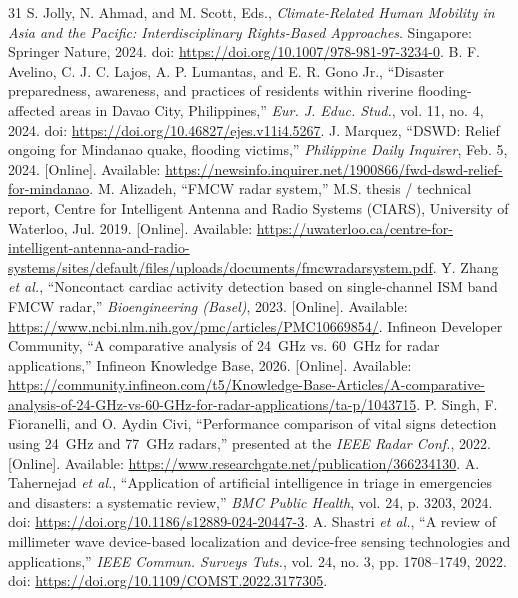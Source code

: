 \documentclass[10pt,conference]{IEEEtran}
\begin{document}
\begin{thebibliography}{31}
 S. Jolly, N. Ahmad, and M. Scott, Eds., \textit{Climate-Related Human Mobility in Asia and the Pacific: Interdisciplinary Rights-Based Approaches}. Singapore: Springer Nature, 2024. doi: \url{https://doi.org/10.1007/978-981-97-3234-0}.
 B. F. Avelino, C. J. C. Lajos, A. P. Lumantas, and E. R. Gono Jr., ``Disaster preparedness, awareness, and practices of residents within riverine flooding-affected areas in Davao City, Philippines,'' \textit{Eur. J. Educ. Stud.}, vol. 11, no. 4, 2024. doi: \url{https://doi.org/10.46827/ejes.v11i4.5267}.
 J. Marquez, ``DSWD: Relief ongoing for Mindanao quake, flooding victims,'' \textit{Philippine Daily Inquirer}, Feb. 5, 2024. [Online]. Available: \url{https://newsinfo.inquirer.net/1900866/fwd-dswd-relief-for-mindanao}.
 M. Alizadeh, ``FMCW radar system,'' M.S. thesis / technical report, Centre for Intelligent Antenna and Radio Systems (CIARS), University of Waterloo, Jul. 2019. [Online]. Available: \url{https://uwaterloo.ca/centre-for-intelligent-antenna-and-radio-systems/sites/default/files/uploads/documents/fmcwradarsystem.pdf}.
 Y. Zhang \textit{et al.}, ``Noncontact cardiac activity detection based on single-channel ISM band FMCW radar,'' \textit{Bioengineering (Basel)}, 2023. [Online]. Available: \url{https://www.ncbi.nlm.nih.gov/pmc/articles/PMC10669854/}.
 Infineon Developer Community, ``A comparative analysis of 24~GHz vs. 60~GHz for radar applications,'' Infineon Knowledge Base, 2026. [Online]. Available: \url{https://community.infineon.com/t5/Knowledge-Base-Articles/A-comparative-analysis-of-24-GHz-vs-60-GHz-for-radar-applications/ta-p/1043715}.
 P. Singh, F. Fioranelli, and O. Aydin Civi, ``Performance comparison of vital signs detection using 24~GHz and 77~GHz radars,'' presented at the \textit{IEEE Radar Conf.}, 2022. [Online]. Available: \url{https://www.researchgate.net/publication/366234130}.
 A. Tahernejad \textit{et al.}, ``Application of artificial intelligence in triage in emergencies and disasters: a systematic review,'' \textit{BMC Public Health}, vol. 24, p. 3203, 2024. doi: \url{https://doi.org/10.1186/s12889-024-20447-3}.
 A. Shastri \textit{et al.}, ``A review of millimeter wave device-based localization and device-free sensing technologies and applications,'' \textit{IEEE Commun. Surveys Tuts.}, vol. 24, no. 3, pp. 1708--1749, 2022. doi: \url{https://doi.org/10.1109/COMST.2022.3177305}.

\end{thebibliography}
\end{document}

